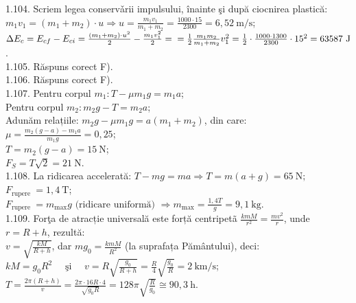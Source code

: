 1.104. Scriem legea conservǎrii impulsului, înainte şi după ciocnirea plastică:\\ $m_{1} v_{1}=\left(m_{1}+m_{2}\right) \cdot u \Rightarrow u=\frac{m_{1} v_{1}}{m_{1}+m_{2}}=\frac{1000 \cdot 15}{2300}=6,52 \mathrm{~m} / \mathrm{s}$;\\ $\Delta E_{c}=E_{c f}-E_{c i}=\frac{\left(m_{1}+m_{2}\right) \cdot u^{2}}{2}-\frac{m_{1} v_{1}^{2}}{2}=\\ =\frac{1}{2} \frac{m_{1} m_{2}}{m_{1}+m_{2}} v_{1}^{2}=\frac{1}{2} \cdot \frac{1000 \cdot 1300}{2300} \cdot 15^{2}=63587 \mathrm{~J}$.\\

1.105. Răspuns corect F).\\

1.106. Răspuns corect F).\\

1.107. Pentru corpul $m_{1}: T-\mu m_{1} g=m_{1} a$;\\ Pentru corpul $m_{2}: m_{2} g-T=m_{2} a$;\\ Adunăm relațiile: $m_{2} g-\mu m_{1} g=a\left(m_{1}+m_{2}\right)$, din care:\\ $\mu=\frac{m_{2}(g-a)-m_{1} a}{m_{1} g}=0,25$;\\ $T=m_{2}(g-a)=15 \mathrm{~N}$;\\ $F_{S}=T \sqrt{2}=21 \mathrm{~N}$.\\

1.108. La ridicarea accelerată: $T-m g=m a \Rightarrow T=m(a+g)=65 \mathrm{~N};$\\ $F_{\text {rupere }}=1,4 \mathrm{~T}$;\\ $F_{\text {rupere }}=m_{\max } g \text { (ridicare uniformă) } \Rightarrow m_{\max }=\frac{1,4 T}{g}=9,1 \mathrm{~kg}$.\\

1.109. Forţa de atracție universală este forță centripetã $\frac{k m M}{r^{2}}=\frac{m v^{2}}{r}$, unde $r=R+h$, rezultă:\\ $v=\sqrt{\frac{k M}{R+h}}$, dar $m g_{0}=\frac{k m M}{R^{2}}$ (la suprafața Pământului), deci:\\ $k M=g_{0} R^{2} \quad \text { şi } \quad v=R \sqrt{\frac{g_{0}}{R+h}}=\frac{R}{4} \sqrt{\frac{g_{0}}{R}}=2 \mathrm{~km} / \mathrm{s}$;\\ $T=\frac{2 \pi(R+h)}{v}=\frac{2 \pi \cdot 16 R \cdot 4}{\sqrt{g_{0} R}}=128 \pi \sqrt{\frac{R}{g_{0}}} \cong 90,3 \mathrm{~h}$.\\

